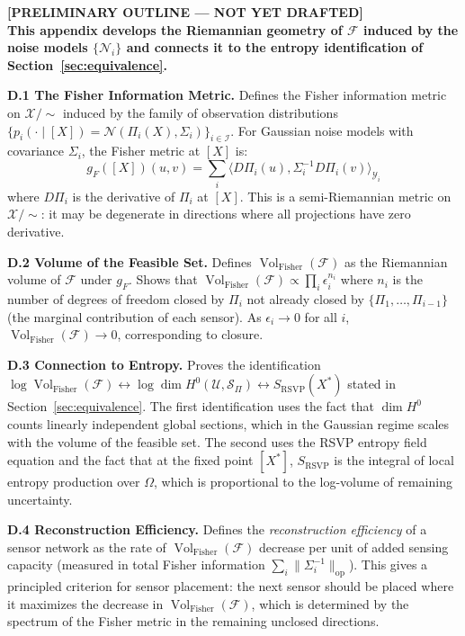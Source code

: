 \documentclass[12pt, oneside]{article}
\newcommand{\preliminary}[1]{%
  \colorbox{yellow!20}{\parbox{\dimexpr\linewidth-2\fboxsep}{%
    \textbf{\textcolor{red!70!black}{[PRELIMINARY OUTLINE --- NOT YET DRAFTED]}}\\[4pt]
    #1
  }}%
}
\DeclareMathOperator{\vol}{Vol}
\newcommand{\Xmod}{\mathcal{X}/{\sim}}
\begin{document}
\preliminary{
\textbf{This appendix develops the Riemannian geometry of $\mathcal{F}$ induced by the
noise models $\{\mathcal{N}_i\}$ and connects it to the entropy identification of
Section~\ref{sec:equivalence}.}

\medskip
\textbf{D.1 The Fisher Information Metric.}
Defines the Fisher information metric on $\Xmod$ induced by the family of observation
distributions $\{p_i(\cdot \mid [X]) = \mathcal{N}(\Pi_i(X), \Sigma_i)\}_{i \in \mathcal{I}}$.
For Gaussian noise models with covariance $\Sigma_i$, the Fisher metric at $[X]$ is:
\[
g_F([X])(u, v) = \sum_i \langle D\Pi_i(u), \Sigma_i^{-1} D\Pi_i(v) \rangle_{\mathcal{Y}_i}
\]
where $D\Pi_i$ is the derivative of $\Pi_i$ at $[X]$. This is a semi-Riemannian metric
on $\Xmod$: it may be degenerate in directions where all projections have zero derivative.

\medskip
\textbf{D.2 Volume of the Feasible Set.}
Defines $\vol_{\mathrm{Fisher}}(\mathcal{F})$ as the Riemannian volume of $\mathcal{F}$
under $g_F$. Shows that $\vol_{\mathrm{Fisher}}(\mathcal{F}) \propto \prod_i \epsilon_i^{n_i}$
where $n_i$ is the number of degrees of freedom closed by $\Pi_i$ not already closed by
$\{\Pi_1,\ldots,\Pi_{i-1}\}$ (the marginal contribution of each sensor). As $\epsilon_i \to 0$
for all $i$, $\vol_{\mathrm{Fisher}}(\mathcal{F}) \to 0$, corresponding to closure.

\medskip
\textbf{D.3 Connection to Entropy.}
Proves the identification
$\log \vol_{\mathrm{Fisher}}(\mathcal{F}) \leftrightarrow \log \dim H^0(\mathcal{U},\mathcal{S}_\Pi)
\leftrightarrow S_{\mathrm{RSVP}}(X^*)$
stated in Section~\ref{sec:equivalence}. The first identification uses the fact that
$\dim H^0$ counts linearly independent global sections, which in the Gaussian regime
scales with the volume of the feasible set. The second uses the RSVP entropy field
equation and the fact that at the fixed point $[X^*]$, $S_{\mathrm{RSVP}}$ is the
integral of local entropy production over $\Omega$, which is proportional to the
log-volume of remaining uncertainty.

\medskip
\textbf{D.4 Reconstruction Efficiency.}
Defines the \emph{reconstruction efficiency} of a sensor network as the rate of
$\vol_{\mathrm{Fisher}}(\mathcal{F})$ decrease per unit of added sensing capacity
(measured in total Fisher information $\sum_i \|\Sigma_i^{-1}\|_{\mathrm{op}}$). This
gives a principled criterion for sensor placement: the next sensor should be placed where
it maximizes the decrease in $\vol_{\mathrm{Fisher}}(\mathcal{F})$, which is determined
by the spectrum of the Fisher metric in the remaining unclosed directions.

}
\end{document}
